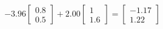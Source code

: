 \documentclass[preview]{standalone}
\begin{document}
\begin{align*}
-3.96 \begin{bmatrix} 0.8 \\ 0.5 \end{bmatrix} + 2.00 \begin{bmatrix} 1 \\ 1.6 \end{bmatrix} = \begin{bmatrix} -1.17 \\ 1.22 \end{bmatrix}
\end{align*}
\end{document}
